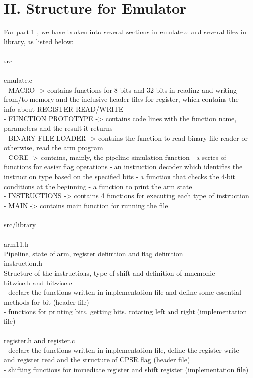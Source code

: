 \documentclass[11pt]{article}
\begin{document}
\section{II. Structure for Emulator}

For part 1 , we have broken into several sections in emulate.c and several 
files in library, as listed below:\\
\\src \\
\\emulate.c\\
 - MACRO -> contains functions for 8 bits and 32 bits in reading and writing 
from/to memory and the inclusive header files for register, which contains 
the info about REGISTER READ/WRITE  \\
 - FUNCTION PROTOTYPE -> contains code lines with the function name, parameters
 and the result it returns\\
 - BINARY FILE LOADER -> contains the function to read binary file reader or 
otherwise, read the arm program \\
 - CORE -> contains, mainly, the pipeline simulation function - a series of 
functions for easier flag operations - an instruction decoder which 
identifies the instruction type based on the specified bits - a function that 
checks the 4-bit conditions at the beginning - a function to print the arm 
state\\
 - INSTRUCTIONS -> contains 4 functions for executing each type of instruction\\
 - MAIN -> contains main function for running the file \\
\\
src/library\\
 \\arm11.h \\
Pipeline, state of arm, register definition and flag definition
 \\instruction.h \\	
Structure of the instructions, type of shift and definition of mnemonic
\\bitwise.h and bitwise.c	\\
 - declare the functions written in implementation file and define some 
essential methods for bit (header file) \\
 - functions for printing bits, getting bits, rotating left and right 
(implementation file) \\
\\register.h and register.c\\
 - declare the functions written in implementation file, define the register 
write and register read and the structure of CPSR flag (header file)\\
 - shifting functions for immediate register and shift register (implementation
 file)\\
 
\end{document}
